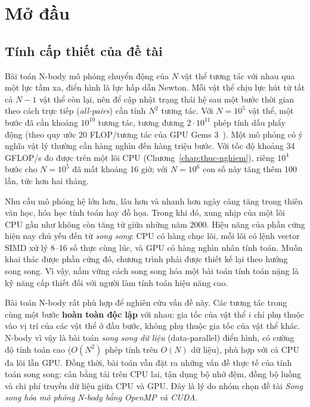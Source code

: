 \chapter{Mở đầu}
\label{chap:mo-dau}

\section{Tính cấp thiết của đề tài}
\label{sec:cap-thiet}

Bài toán N-body mô phỏng chuyển động của $N$ vật thể tương tác với nhau qua một lực tầm xa, điển hình là lực hấp dẫn Newton. Mỗi vật thể chịu lực hút từ tất cả $N-1$ vật thể còn lại, nên để cập nhật trạng thái hệ sau một bước thời gian theo cách trực tiếp (\emph{all-pairs}) cần tính $N^2$ tương tác. Với $N=10^5$ vật thể, một bước đã cần khoảng $10^{10}$ tương tác, tương đương $2\cdot10^{11}$ phép tính dấu phẩy động (theo quy ước 20 FLOP/tương tác của GPU Gems 3~\cite{gpugems3}). Một mô phỏng có ý nghĩa vật lý thường cần hàng nghìn đến hàng triệu bước. Với tốc độ khoảng 34 GFLOP/s đo được trên một lõi CPU (Chương~\ref{chap:thuc-nghiem}), riêng $10^4$ bước cho $N=10^5$ đã mất khoảng 16 giờ; với $N=10^6$ con số này tăng thêm 100 lần, tức hơn hai tháng.

Nhu cầu mô phỏng hệ lớn hơn, lâu hơn và nhanh hơn ngày càng tăng trong thiên văn học, hóa học tính toán hay đồ họa. Trong khi đó, xung nhịp của một lõi CPU gần như không còn tăng từ giữa những năm 2000. Hiệu năng của phần cứng hiện nay chủ yếu đến từ \emph{song song}: CPU có hàng chục lõi, mỗi lõi có lệnh vector SIMD xử lý 8--16 số thực cùng lúc, và GPU có hàng nghìn nhân tính toán. Muốn khai thác được phần cứng đó, chương trình phải được thiết kế lại theo hướng song song. Vì vậy, nắm vững cách song song hóa một bài toán tính toán nặng là kỹ năng cấp thiết đối với người làm tính toán hiệu năng cao.

Bài toán N-body rất phù hợp để nghiên cứu vấn đề này. Các tương tác trong cùng một bước \textbf{hoàn toàn độc lập} với nhau: gia tốc của vật thể $i$ chỉ phụ thuộc vào vị trí của các vật thể ở đầu bước, không phụ thuộc gia tốc của vật thể khác. N-body vì vậy là bài toán \emph{song song dữ liệu} (data-parallel) điển hình, có cường độ tính toán cao ($O(N^2)$ phép tính trên $O(N)$ dữ liệu), phù hợp với cả CPU đa lõi lẫn GPU. Đồng thời, bài toán vẫn đặt ra những vấn đề thực tế của tính toán song song: cân bằng tải trên CPU lai, tận dụng bộ nhớ đệm, đồng bộ luồng và chi phí truyền dữ liệu giữa CPU và GPU. Đây là lý do nhóm chọn đề tài \emph{Song song hóa mô phỏng N-body bằng OpenMP và CUDA}.

